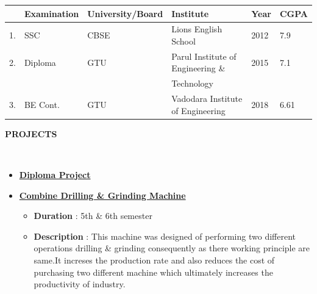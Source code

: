 \documentclass[a4paper,10pt]{article}
\newcommand{\isep}{-2 pt}
\newcommand{\lsep}{-0.5cm}
\newcommand{\resheading}[1]{{\small \colorbox{mygrey}{\begin{minipage}{0.975\textwidth}{\textbf{#1 \vphantom{p\^{E}}}}\end{minipage}}}}
\begin{document}
\indent \begin{tabular}
{ l @{\hskip 0.15in} l @{\hskip 0.15in} l @{\hskip 0.15in} l @{\hskip 0.15in} l @{\hskip 0.15in} l }
\hline
\centering
\textbf {\centering{Sr. No.}} & \textbf{Examination} & \textbf{University/Board} & \textbf{Institute} & \textbf{Year} & \textbf{CGPA} \\
\hline
1. & SSC & CBSE & Lions English School & 2012 & 7.9 \\
2. & Diploma & GTU & Parul Institute of Engineering \&  & 2015 & 7.1\\
& & & Technology\\
3. &BE Cont. & GTU & Vadodara Institute of Engineering & 2018 & 6.61\\
\hline
\end{tabular}

\hspace{5cm}
\resheading{\textbf{\Large{PROJECTS}} }\\[\lsep]

\begin{itemize}
\item \underline{\Large{\textbf{Diploma Project}\\}}
\end{itemize}
\begin{itemize}
 	\begin{itemize}
 	\item \underline{\textbf{Combine Drilling \& Grinding Machine}}
 	\begin{itemize}\itemsep \isep
 	    \item \textbf{Duration} : 5th \& 6th semester
	    \item \textbf{Description} : This machine was designed of performing two different operations drilling \& grinding consequently as there working principle are same.It increses the production rate and also reduces the cost of purchasing two different machine which ultimately increases the productivity of industry. 
	    \end{itemize}
	\end{itemize}
    \end{itemize}	
    
\end{document}

